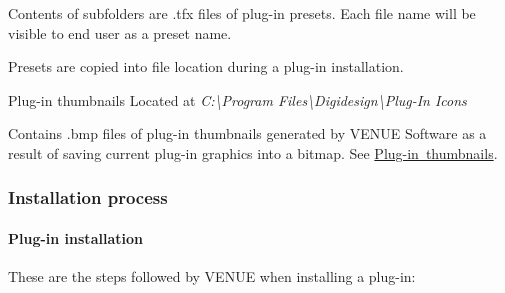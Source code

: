  Contents of subfolders are .tfx files of plug-\/in presets. Each file name will be visible to end user as a preset name.

 Presets are copied into file location during a plug-\/in installation.

 Plug-\/in thumbnails Located at {\itshape C\+:\textbackslash{}Program Files\textbackslash{}Digidesign\textbackslash{}Plug-\/\+In Icons}

 Contains .bmp files of plug-\/in thumbnails generated by V\+E\+N\+UE Software as a result of saving current plug-\/in graphics into a bitmap. See \mbox{\hyperlink{a00849_subsubsection__aax_venue_guide__installer__optional_files__thumbnails}{Plug-\/in thumbnails}}.

\hypertarget{a00849_subsection__aax_venue_guide__system_details__plugin_installation}{}\subsubsection{Installation process}\label{a00849_subsection__aax_venue_guide__system_details__plugin_installation}
 \hypertarget{a00849_subsubsection__aax_venue_guide__system_details__plugin_installation__install}{}\paragraph{Plug-\/in installation}\label{a00849_subsubsection__aax_venue_guide__system_details__plugin_installation__install}
 These are the steps followed by V\+E\+N\+UE when installing a plug-\/in\+: 

